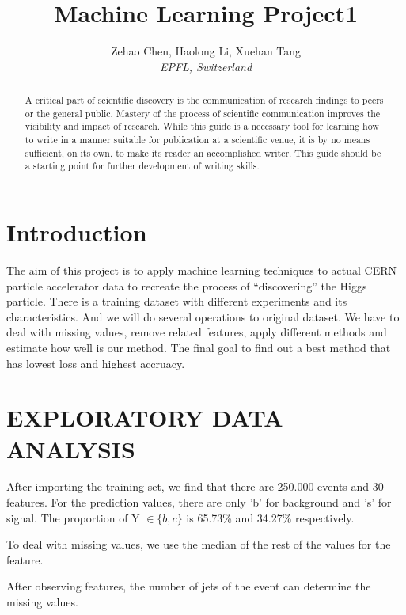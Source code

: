 \documentclass[10pt,conference,compsocconf]{IEEEtran}
\begin{document}
\title{Machine Learning Project1}

\author{
  Zehao Chen, Haolong Li, Xuehan Tang\\
  \textit{EPFL, Switzerland}
}

\maketitle

\begin{abstract}
  A critical part of scientific discovery is the
  communication of research findings to peers or the general public.
  Mastery of the process of scientific communication improves the
  visibility and impact of research. While this guide is a necessary
  tool for learning how to write in a manner suitable for publication
  at a scientific venue, it is by no means sufficient, on its own, to
  make its reader an accomplished writer. 
  This guide should be a starting point for further development of 
  writing skills.
\end{abstract}

\section{Introduction}

The aim of this project is to apply machine learning techniques to actual CERN particle accelerator data to recreate the process of
“discovering” the Higgs particle. There is a training dataset with
different experiments and its characteristics. And we will do several operations to original dataset. We have to deal with missing values, remove related features, apply different methods and estimate how well is our method. The final goal to find out a best method that has lowest loss and highest accruacy.

\section{EXPLORATORY DATA ANALYSIS}
\label{sec:structure-paper}

After importing the training set, we find that there are 250.000 events and 30 features. For the prediction values, there are only 'b' for background and 's' for signal. The proportion of Y $\in \{b,c\}$ 
is 65.73\% and 34.27\% respectively.

To deal with missing values, we use the median of the rest of the values for the feature.

After observing features, the number of jets of the event can determine the missing values.
\end{document}
